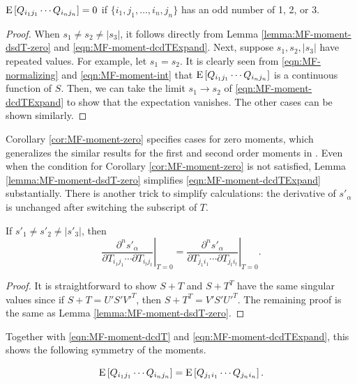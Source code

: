 \begin{corollary} \label{cor:MF-moment-zero}
	$\mathrm{E}\left[ Q_{i_1j_1} \cdots Q_{i_nj_n} \right] = 0$ if $\{i_1,j_1,\ldots,i_n,j_n\}$ has an odd number of 1, 2, or 3.
\end{corollary}
\begin{proof}
	When $s_1 \neq s_2 \neq |s_3|$, it follows directly from Lemma \ref{lemma:MF-moment-dsdT-zero} and \eqref{eqn:MF-moment-dcdTExpand}.
	Next, suppose $s_1, s_2, |s_3|$ have repeated values. 
	For example, let $s_1 = s_2$.
	It is clearly seen from \eqref{eqn:MF-normalizing} and \eqref{eqn:MF-moment-int} that $\mathrm{E}\left[ Q_{i_1j_1} \cdots Q_{i_nj_n} \right]$ is a continuous function of $S$.
	Then, we can take the limit $s_1\rightarrow s_2$ of \eqref{eqn:MF-moment-dcdTExpand} to show that the expectation vanishes. 
	The other cases can be shown similarly. 
\end{proof}

Corollary \ref{cor:MF-moment-zero} specifies cases for zero moments, which generalizes the similar results for the first and second order moments in \cite{khatri1977mises}.
Even when the condition for Corollary \ref{cor:MF-moment-zero} is not satisfied, Lemma \ref{lemma:MF-moment-dsdT-zero} simplifies \eqref{eqn:MF-moment-dcdTExpand} substantially.
There is another trick to simplify calculations: the derivative of $s'_\alpha$ is unchanged after switching the subscript of $T$.

\begin{lemma}
	If $s'_1 \neq s'_2 \neq |s'_3|$, then 
	\begin{equation}
		\left. \frac{\partial^n s'_\alpha}{\partial T_{i_1j_1} \cdots \partial T_{i_tj_t}} \right|_{T=0} = \left. \frac{\partial^n s'_\alpha}{\partial T_{j_1i_1} \cdots \partial T_{j_ti_t}} \right|_{T=0}.
	\end{equation}
\end{lemma}
\begin{proof}
	It is straightforward to show $S+T$ and $S+T^T$ have the same singular values since if $S+T = U'S'V'^T$, then $S+T^T = V'S'U'^T$.
	The remaining proof is the same as Lemma \ref{lemma:MF-moment-dsdT-zero}.
\end{proof}
Together with \eqref{eqn:MF-moment-dcdT} and \eqref{eqn:MF-moment-dcdTExpand}, this shows the following symmetry of the moments. 
\begin{corollary} \label{cor:MF-moment-switch}
	\begin{equation}
		\mathrm{E}\left[ Q_{i_1j_1} \cdots Q_{i_nj_n} \right] = \mathrm{E}\left[ Q_{j_1i_1} \cdots Q_{j_ni_n} \right].
	\end{equation}
\end{corollary}

